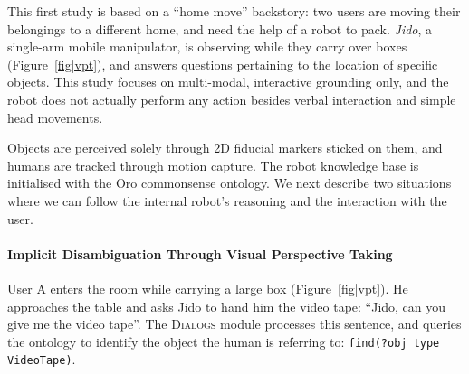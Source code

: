 \documentclass[preprint,3p,times]{elsarticle}
\newcommand{\concept}[1]{{\small \texttt{#1}}}
\begin{document}
This first study is based on a ``home move'' backstory: two users are moving
their belongings to a different home, and need the help of a robot to pack.
\emph{Jido}, a single-arm mobile manipulator, is observing while they carry
over boxes (Figure~\ref{fig|vpt}), and answers questions pertaining to the
location of specific objects.  This study focuses on multi-modal, interactive
grounding only, and the robot does not actually perform any action besides
verbal interaction and simple head movements.

Objects are perceived solely through 2D fiducial markers sticked on them, and humans are
tracked through motion capture. The robot knowledge base is initialised with
the {\sc Oro} commonsense ontology.  We next describe two
situations where we can follow the internal robot's reasoning and the
interaction with the user.

\paragraph{Implicit Disambiguation Through Visual Perspective Taking}

\begin{figure}[!ht]
  \centering
\end{figure}


User A enters the room while carrying a large box (Figure~\ref{fig|vpt}). He
approaches the table and asks Jido to hand him the video tape: ``Jido, can
you give me the video tape''. The \textsc{Dialogs} module processes this
sentence, and queries the ontology to
identify the object the human is referring to: \concept{find(?obj type
VideoTape)}. 
\end{document}
